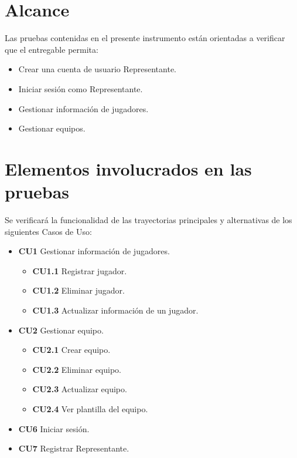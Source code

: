 \documentclass[oneside,10pt]{book}
\begin{document}
\section{Alcance}

	Las pruebas contenidas en el presente instrumento están orientadas a verificar que el entregable permita:

\begin{itemize}
\item Crear una cuenta de usuario Representante.
\item Iniciar sesión como Representante.
\item Gestionar información de jugadores.
\item Gestionar equipos.
\end{itemize}

\section{Elementos involucrados en las pruebas}

	Se verificará la funcionalidad de las trayectorias principales y alternativas de los siguientes Casos de Uso:
\begin{itemize}
\item \textbf{CU1} Gestionar información de jugadores.
	\begin{itemize}
	\item \textbf{CU1.1} Registrar jugador.
	\item \textbf{CU1.2} Eliminar jugador.
	\item \textbf{CU1.3} Actualizar información de un jugador.
	\end{itemize}
\item \textbf{CU2} Gestionar equipo.
	\begin{itemize}
	\item \textbf{CU2.1} Crear equipo.
	\item \textbf{CU2.2} Eliminar equipo.
	\item \textbf{CU2.3} Actualizar equipo.
	\item \textbf{CU2.4} Ver plantilla del equipo.
	\end{itemize}
\item \textbf{CU6} Iniciar sesión.
\item \textbf{CU7} Registrar Representante.
\end{itemize}
\end{document}
